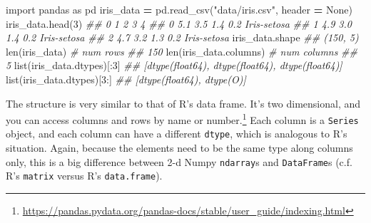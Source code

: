\documentclass[
  12pt,
  krantz2]{krantz}
\makeatletter
\newenvironment{Shaded}{\begin{snugshade}}{\end{snugshade}}
\newcommand{\BuiltInTok}[1]{#1}
\newcommand{\CommentTok}[1]{\textcolor[rgb]{0.37,0.37,0.37}{\textit{#1}}}
\newcommand{\DecValTok}[1]{\textcolor[rgb]{0.06,0.06,0.06}{#1}}
\newcommand{\ImportTok}[1]{#1}
\newcommand{\NormalTok}[1]{#1}
\newcommand{\OperatorTok}[1]{\textcolor[rgb]{0.43,0.43,0.43}{\textbf{#1}}}
\newcommand{\StringTok}[1]{\textcolor[rgb]{0.5,0.5,0.5}{#1}}
\newcommand{\VariableTok}[1]{\textcolor[rgb]{0,0,0}{#1}}
\renewcommand{\href}[2]{#2\footnote{\url{#1}}}
\newenvironment{kframe}{%
\medskip{}
\setlength{\fboxsep}{.8em}
 \def\at@end@of@kframe{}%
 \ifinner\ifhmode%
  \def\at@end@of@kframe{\end{minipage}}%
  \begin{minipage}{\columnwidth}%
 \fi\fi%
 \def\FrameCommand##1{\hskip\@totalleftmargin \hskip-\fboxsep
 \colorbox{shadecolor}{##1}\hskip-\fboxsep
     \hskip-\linewidth \hskip-\@totalleftmargin \hskip\columnwidth}%
 \MakeFramed {\advance\hsize-\width
   \@totalleftmargin\z@ \linewidth\hsize
   \@setminipage}}%
 {\par\unskip\endMakeFramed%
 \at@end@of@kframe}
\renewenvironment{Shaded}{\begin{kframe}}{\end{kframe}}
\makeatother
\begin{document}
\begin{Shaded}
\begin{Highlighting}[]
\ImportTok{import}\NormalTok{ pandas }\ImportTok{as}\NormalTok{ pd}
\NormalTok{iris\_data }\OperatorTok{=}\NormalTok{ pd.read\_csv(}\StringTok{"data/iris.csv"}\NormalTok{, header }\OperatorTok{=} \VariableTok{None}\NormalTok{)}
\NormalTok{iris\_data.head(}\DecValTok{3}\NormalTok{)}
\CommentTok{\#\#      0    1    2    3            4}
\CommentTok{\#\# 0  5.1  3.5  1.4  0.2  Iris{-}setosa}
\CommentTok{\#\# 1  4.9  3.0  1.4  0.2  Iris{-}setosa}
\CommentTok{\#\# 2  4.7  3.2  1.3  0.2  Iris{-}setosa}
\NormalTok{iris\_data.shape}
\CommentTok{\#\# (150, 5)}
\BuiltInTok{len}\NormalTok{(iris\_data) }\CommentTok{\# num rows}
\CommentTok{\#\# 150}
\BuiltInTok{len}\NormalTok{(iris\_data.columns) }\CommentTok{\# num columns}
\CommentTok{\#\# 5}
\BuiltInTok{list}\NormalTok{(iris\_data.dtypes)[:}\DecValTok{3}\NormalTok{]}
\CommentTok{\#\# [dtype(\textquotesingle{}float64\textquotesingle{}), dtype(\textquotesingle{}float64\textquotesingle{}), dtype(\textquotesingle{}float64\textquotesingle{})]}
\BuiltInTok{list}\NormalTok{(iris\_data.dtypes)[}\DecValTok{3}\NormalTok{:]}
\CommentTok{\#\# [dtype(\textquotesingle{}float64\textquotesingle{}), dtype(\textquotesingle{}O\textquotesingle{})]}
\end{Highlighting}
\end{Shaded}

The structure is very similar to that of R's data frame. It's two dimensional, and you can \href{https://pandas.pydata.org/pandas-docs/stable/user_guide/indexing.html}{access columns and rows by name or number.} Each column is a \texttt{Series} object, and each column can have a different \texttt{dtype}, which is analogous to R's situation. Again, because the elements need to be the same type along columns only, this is a big difference between 2-d Numpy \texttt{ndarray}s and \texttt{DataFrame}s (c.f. R's \texttt{matrix} versus R's \texttt{data.frame}).
\end{document}
